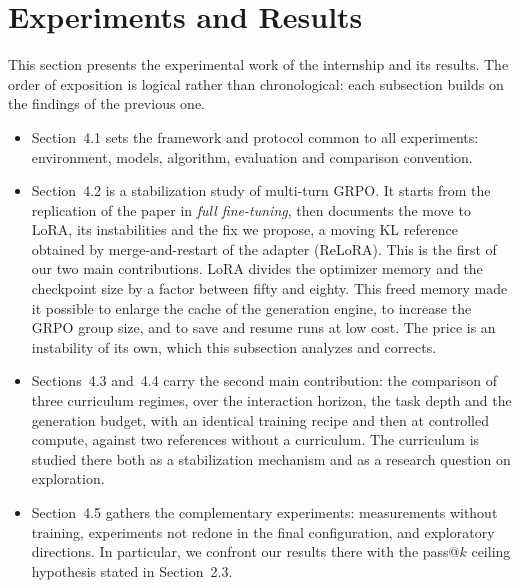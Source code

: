 \documentclass[11pt,a4paper]{article}
\begin{document}
\newpage

\section{Experiments and Results}

This section presents the experimental work of the internship and its results. The order of exposition is logical rather than chronological: each subsection builds on the findings of the previous one.

\begin{itemize}
    \item Section~4.1 sets the framework and protocol common to all experiments: environment, models, algorithm, evaluation and comparison convention.
    \item Section~4.2 is a stabilization study of multi-turn GRPO. It starts from the replication of the paper in \emph{full fine-tuning}, then documents the move to LoRA, its instabilities and the fix we propose, a moving KL reference obtained by merge-and-restart of the adapter (ReLoRA). This is the first of our two main contributions. LoRA divides the optimizer memory and the checkpoint size by a factor between fifty and eighty. This freed memory made it possible to enlarge the cache of the generation engine, to increase the GRPO group size, and to save and resume runs at low cost. The price is an instability of its own, which this subsection analyzes and corrects.
    \item Sections~4.3 and~4.4 carry the second main contribution: the comparison of three curriculum regimes, over the interaction horizon, the task depth and the generation budget, with an identical training recipe and then at controlled compute, against two references without a curriculum. The curriculum is studied there both as a stabilization mechanism and as a research question on exploration.
    \item Section~4.5 gathers the complementary experiments: measurements without training, experiments not redone in the final configuration, and exploratory directions. In particular, we confront our results there with the pass@$k$ ceiling hypothesis stated in Section~2.3.
\end{itemize}
\end{document}

